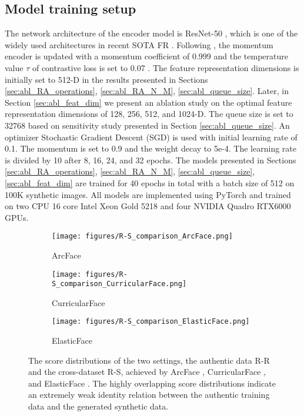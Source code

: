 \documentclass[10pt,twocolumn,letterpaper]{ieeeconf}
\begin{document}
\subsection{Model training setup}
The network architecture of the encoder model is ResNet-50 \cite{ResNet}, which is one of the widely used architectures in recent SOTA FR \cite{ArcFace, PartialFC, CurricularFace, ElasticFace}. Following \cite{Moco}, the momentum encoder is updated with a momentum coefficient of 0.999 \cite{Moco} and the temperature value $\tau$ of contrastive loss is set to 0.07 \cite{Moco}. The feature representation dimensions is initially set to 512-D in the results presented in Sections \ref{sec:abl_RA_operations}, \ref{sec:abl_RA_N_M}, \ref{sec:abl_queue_size}.
Later, in Section \ref{sec:abl_feat_dim} we present an ablation study on the optimal feature representation dimensions of 128, 256, 512, and 1024-D. The queue size is set to 32768 based on sensitivity study presented in Section \ref{sec:abl_queue_size}. 
An optimizer Stochastic Gradient Descent (SGD) is used with initial learning rate of 0.1. The momentum is set to 0.9 and the weight decay to 5e-4. The learning rate is divided by 10 after 8, 16, 24, and 32 epochs. The models presented in Sections \ref{sec:abl_RA_operations}, \ref{sec:abl_RA_N_M}, \ref{sec:abl_queue_size}, \ref{sec:abl_feat_dim} are trained for 40 epochs in total with a batch size of 512 on 100K synthetic images. 
All models are implemented using PyTorch \cite{PyTorch} and trained on two CPU 16 core Intel Xeon Gold 5218 and four NVIDIA Quadro RTX6000 GPUs.



\begin{figure*}[ht!]
	\centering
    \begin{subfigure}[b]{0.25\linewidth}
        \centering
        \texttt{[image: figures/R-S\_comparison\_ArcFace.png]}
        \caption{ArcFace}
        \label{fig:R-S_ArcFace}
    \end{subfigure}
\begin{subfigure}[b]{0.25\linewidth}
        \centering
        \texttt{[image: figures/R-S\_comparison\_CurricularFace.png]}
        \caption{CurricularFace}
        \label{fig:R-S_CurricularFace}
    \end{subfigure}
\begin{subfigure}[b]{0.25\linewidth}
        \centering
        \texttt{[image: figures/R-S\_comparison\_ElasticFace.png]}
        \caption{ElasticFace}
        \label{fig:R-S_ElasticFace}
    \end{subfigure}
    \vspace{-3mm}
	\caption{The score distributions of the two settings, the authentic data R-R and the cross-dataset R-S, achieved by ArcFace \cite{ArcFace}, CurricularFace \cite{CurricularFace}, and ElasticFace \cite{ElasticFace}. The highly overlapping score distributions indicate an extremely weak identity relation between the authentic training data and the generated synthetic data.}
	\label{fig:R-S_comparison}
	\vspace{-4mm}
\end{figure*}
\end{document}
